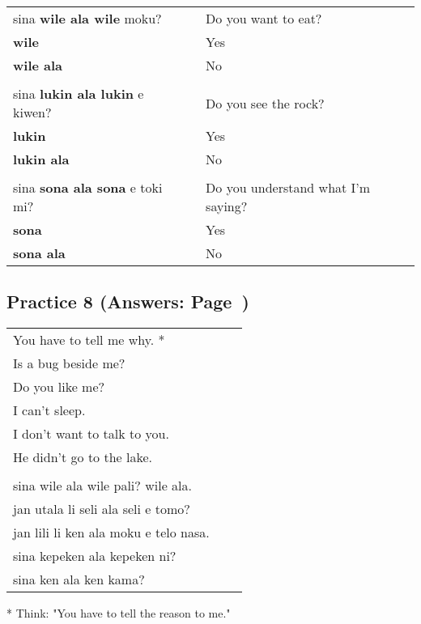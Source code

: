 \begin{supertabular}{p{5,5cm}|ll}
sina \textbf{wile ala wile} moku? && Do you want to eat? \\ \textbf{wile} && Yes \\ \textbf{wile ala} && No \\
 && \\ %
sina \textbf{lukin ala lukin} e kiwen? && Do you see the rock? \\ \textbf{lukin} && Yes \\ \textbf{lukin ala} && No \\
 && \\ %
sina \textbf{sona ala sona} e toki mi? && Do you understand what I'm saying? \\ \textbf{sona} && Yes \\ \textbf{sona ala} && No \\
\end{supertabular}  
%
\subsection*{Practice 8 (Answers: Page~\pageref{'negation_yes_no_questions'})}
%

\begin{supertabular}{p{5,5cm}|ll}
   You have to tell me why. *  &&   \\ %
   Is a bug beside me?  &&    \\ %
   Do you like me?   &&   \\ %
   I can't sleep.  &&    \\ %
   I don't want to talk to you.  &&    \\ %
   He didn't go to the lake.   &&   \\ %
 && \\ %
   sina wile ala wile pali? wile ala.  &&    \\ %
   jan utala li seli ala seli e tomo?   &&   \\ %
   jan lili li ken ala moku e telo nasa.   &&   \\ %
   sina kepeken ala kepeken ni?  &&    \\ %
   sina ken ala ken kama?   &&   \\ %
\end{supertabular} 

* Think: "You have to tell the reason to me." 
